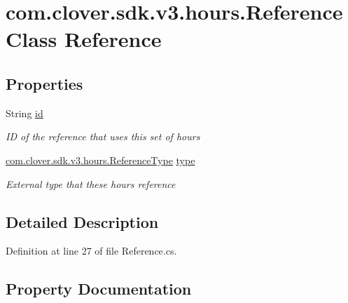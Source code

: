 \hypertarget{classcom_1_1clover_1_1sdk_1_1v3_1_1hours_1_1_reference}{}\section{com.\+clover.\+sdk.\+v3.\+hours.\+Reference Class Reference}
\label{classcom_1_1clover_1_1sdk_1_1v3_1_1hours_1_1_reference}
\subsection*{Properties}
\begin{DoxyCompactItemize}
\item 
String \hyperlink{classcom_1_1clover_1_1sdk_1_1v3_1_1hours_1_1_reference_a90adac087d76238ec6608fa6a8c41135}{id}
\begin{DoxyCompactList}\small\item\em ID of the reference that uses this set of hours \end{DoxyCompactList}\item 
\hyperlink{namespacecom_1_1clover_1_1sdk_1_1v3_1_1hours_a8525667c21e8dadaefd0a149ff85b867}{com.\+clover.\+sdk.\+v3.\+hours.\+Reference\+Type} \hyperlink{classcom_1_1clover_1_1sdk_1_1v3_1_1hours_1_1_reference_ad2681c4206e183b6b2415b93ca2278d7}{type}
\begin{DoxyCompactList}\small\item\em External type that these hours reference \end{DoxyCompactList}\end{DoxyCompactItemize}


\subsection{Detailed Description}


Definition at line 27 of file Reference.\+cs.



\subsection{Property Documentation}
\mbox{\label{classcom_1_1clover_1_1sdk_1_1v3_1_1hours_1_1_reference_a90adac087d76238ec6608fa6a8c41135}} 
